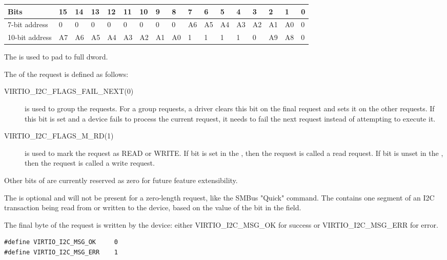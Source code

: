 \begin{tabular}{ |l||l|l|l|l|l|l|l|l|l|l|l|l|l|l|l|l| }
\hline
Bits           & 15 & 14 & 13 & 12 & 11 & 10 & 9  & 8  & 7  & 6  & 5  & 4  & 3  & 2  & 1  & 0 \\
\hline
7-bit address  & 0  & 0  & 0  & 0  & 0  & 0  & 0  & 0  & A6 & A5 & A4 & A3 & A2 & A1 & A0 & 0 \\
\hline
10-bit address & A7 & A6 & A5 & A4 & A3 & A2 & A1 & A0 & 1  & 1  & 1  & 1  & 0  & A9 & A8 & 0 \\
\hline
\end{tabular}

The  is used to pad to full dword.

The  of the request is defined as follows:

\begin{description}
\item[VIRTIO_I2C_FLAGS_FAIL_NEXT(0)] is used to group the requests.
    For a group requests, a driver clears this bit on the final request
    and sets it on the other requests. If this bit is set and a device fails
    to process the current request, it needs to fail the next request instead
    of attempting to execute it.

\item[VIRTIO_I2C_FLAGS_M_RD(1)] is used to mark the request as READ or WRITE.
    If  bit is set in the , then the
    request is called a read request. If  bit is
    unset in the , then the request is called a write request.
\end{description}

Other bits of  are currently reserved as zero for future feature
extensibility.

The  is optional and will not be present for a zero-length request,
like the SMBus "Quick" command. The  contains one segment of an I2C
transaction being read from or written to the device, based on the value of the
 bit in the  field.

The final  byte of the request is written by the device: either
VIRTIO_I2C_MSG_OK for success or VIRTIO_I2C_MSG_ERR for error.

\begin{lstlisting}
#define VIRTIO_I2C_MSG_OK     0
#define VIRTIO_I2C_MSG_ERR    1
\end{lstlisting}

